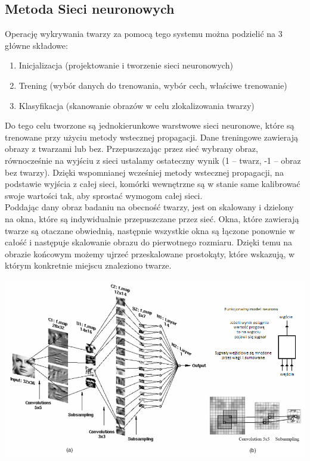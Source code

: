 \documentclass[11pt,a4paper]{article}
\begin{document}
\subsection{Metoda Sieci neuronowych}
Operację wykrywania twarzy za pomocą tego systemu można podzielić na 3 główne składowe:
\begin{enumerate}
\item Inicjalizacja (projektowanie i tworzenie sieci neuronowych)
\item Trening (wybór danych do trenowania, wybór cech, właściwe trenowanie)
\item Klasyfikacja (skanowanie obrazów w celu zlokalizowania twarzy)
\end{enumerate}

\noindent 
Do tego celu tworzone są jednokierunkowe warstwowe sieci neuronowe, które są trenowane przy użyciu metody wstecznej propagacji. Dane treningowe zawierają obrazy z twarzami lub bez. Przepuszczając przez sieć wybrany obraz, równocześnie na wyjściu z sieci ustalamy ostateczny wynik (1 – twarz, -1 – obraz bez twarzy).  Dzięki wspomnianej wcześniej metody wstecznej propagacji, na podstawie wyjścia z całej sieci, komórki wewnętrzne są w stanie same kalibrować swoje wartości tak, aby sprostać wymogom całej sieci.\\
Poddając dany obraz badaniu na obecność twarzy, jest on skalowany i dzielony na okna, które są indywidualnie przepuszczane przez sieć. Okna, które zawierają twarze są otaczane obwiednią, następnie wszystkie okna są łączone ponownie w całość i następuje skalowanie obrazu do pierwotnego rozmiaru. Dzięki temu na obrazie końcowym możemy ujrzeć przeskalowane prostokąty, które wskazują, w którym konkretnie miejscu znaleziono twarze.

\vspace*{1cm}
\includegraphics[scale=0.65]{cnn.png}
\vspace*{1cm}
\end{document}
